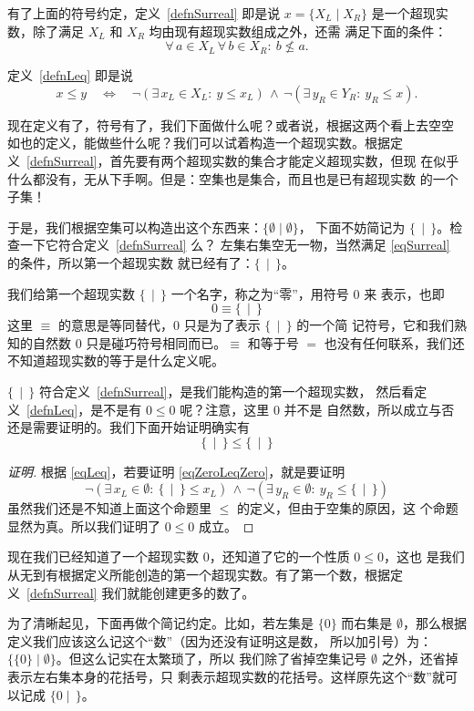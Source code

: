 \documentclass[cs4size,a4paper,adobefonts]{ctexart}
\numberwithin{equation}{section}
\begin{document}
有了上面的符号约定，定义~\ref{defnSurreal} 即是说 $x=\{X_L \mid X_R\}$
是一个超现实数，除了满足 $X_L$ 和 $X_R$ 均由现有超现实数组成之外，还需
满足下面的条件：
\begin{equation}
  \label{eqSurreal}
  \forall\, a \in X_L \,\forall\, b \in X_R:\: b\nleq a.
\end{equation}

定义~\ref{defnLeq} 即是说
\begin{equation}
  \label{eqLeq}
  x \leq y \quad\Leftrightarrow\quad
  \neg(\exists\, x_L \in X_L :\: y \leq x_L)\, \wedge \,
  \neg(\exists\, y_R \in Y_R :\: y_R \leq x).
\end{equation}

现在定义有了，符号有了，我们下面做什么呢？或者说，根据这两个看上去空空
如也的定义，能做些什么呢？我们可以试着构造一个超现实数。根据定
义~\ref{defnSurreal}，首先要有两个超现实数的集合才能定义超现实数，但现
在似乎什么都没有，无从下手啊。但是：空集也是集合，而且也是已有超现实数
的一个子集！

于是，我们根据空集可以构造出这个东西来：$\{\emptyset\mid\emptyset\}$，
下面不妨简记为 $\{\,\mid\,\}$。检查一下它符合定义~\ref{defnSurreal} 么？
左集右集空无一物，当然满足 \eqref{eqSurreal} 的条件，所以第一个超现实数
就已经有了：$\{\,\mid\,\}$。

我们给第一个超现实数 $\{\,\mid\,\}$ 一个名字，称之为“零”，用符号 $0$ 来
表示，也即
\begin{equation}
  0 \equiv \{\,\mid\,\}
\end{equation}
这里 $\equiv$ 的意思是等同替代，0 只是为了表示 $\{\,\mid\,\}$ 的一个简
记符号，它和我们熟知的自然数 0 只是碰巧符号相同而已。$\equiv$ 和等于号
$=$ 也没有任何联系，我们还不知道超现实数的等于是什么定义呢。

$\{\,\mid\,\}$ 符合定义~\ref{defnSurreal}，是我们能构造的第一个超现实数，
然后看定义~\ref{defnLeq}，是不是有 $0 \leq 0$ 呢？注意，这里 $0$ 并不是
自然数，所以成立与否还是需要证明的。我们下面开始证明确实有
\begin{equation}
  \label{eqZeroLeqZero}
  \{\,\mid\,\}\leq\{\,\mid\,\}
\end{equation}

\begin{proof}[证明]
  根据 \eqref{eqLeq}，若要证明 \eqref{eqZeroLeqZero}，就是要证明
  \[
  \neg(\exists\,x_L\in\emptyset:\:\{\,\mid\,\}\leq x_L)\,\wedge\,
  \neg(\exists\,y_R\in\emptyset:\:y_R\leq\{\,\mid\,\})
  \]
  虽然我们还是不知道上面这个命题里 $\leq$ 的定义，但由于空集的原因，这
  个命题显然为真。所以我们证明了 $0\leq0$ 成立。
\end{proof}

现在我们已经知道了一个超现实数 $0$，还知道了它的一个性质 $0\leq0$，这也
是我们从无到有根据定义所能创造的第一个超现实数。有了第一个数，根据定
义~\ref{defnSurreal} 我们就能创建更多的数了。

为了清晰起见，下面再做个简记约定。比如，若左集是 $\{0\}$ 而右集是
$\emptyset$，那么根据定义我们应该这么记这个“数”（因为还没有证明这是数，
  所以加引号）为：$\{\{0\}\mid\emptyset\}$。但这么记实在太繁琐了，所以
我们除了省掉空集记号 $\emptyset$ 之外，还省掉表示左右集本身的花括号，只
剩表示超现实数的花括号。这样原先这个“数”就可以记成 $\{0\mid\,\}$。
\end{document}
